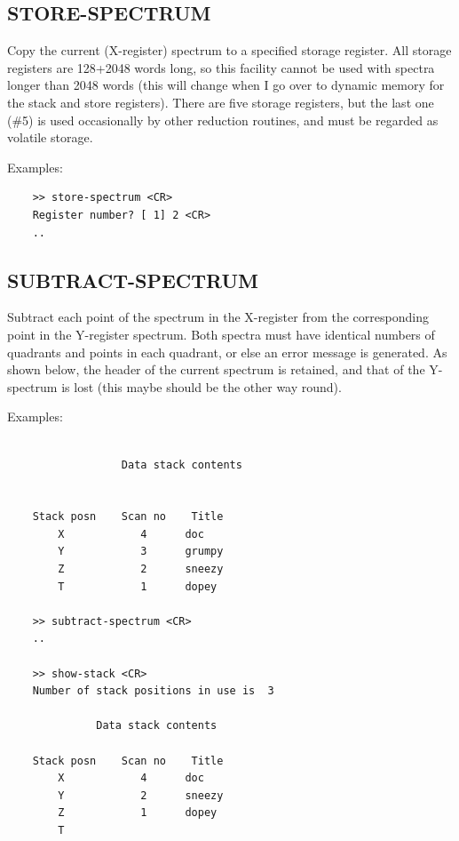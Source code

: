 \documentclass[11pt,twoside]{report}
\begin{document}
\subsection{STORE-SPECTRUM} 
                            

Copy the current (X-register) spectrum to a specified storage register.
All storage registers are 128+2048 words long, so this facility cannot
be used with spectra longer than 2048 words (this will change when I go
over to dynamic memory for the stack and store registers). There are
five storage registers, but the last one (\#5) is used occasionally by
other reduction routines, and must be regarded as volatile storage.

Examples:
\begin{verbatim}
    >> store-spectrum <CR>
    Register number? [ 1] 2 <CR>
    ..
\end{verbatim}

\subsection{SUBTRACT-SPECTRUM} 

Subtract each point of the spectrum in the X-register from the corresponding
point in the Y-register spectrum. Both spectra must have identical numbers
of quadrants and points in each quadrant, or else an error message is
generated. As shown below, the header of the current spectrum is retained,
and that of the Y-spectrum is lost (this maybe should be the other way
round).

Examples:
\begin{verbatim}

                  Data stack contents


    Stack posn    Scan no    Title
        X            4      doc                       
        Y            3      grumpy                    
        Z            2      sneezy                    
        T            1      dopey                     

    >> subtract-spectrum <CR>
    ..

    >> show-stack <CR>
    Number of stack positions in use is  3

              Data stack contents

    Stack posn    Scan no    Title
        X            4      doc                       
        Y            2      sneezy                    
        Z            1      dopey                     
        T                                             
\end{verbatim}
\end{document}
